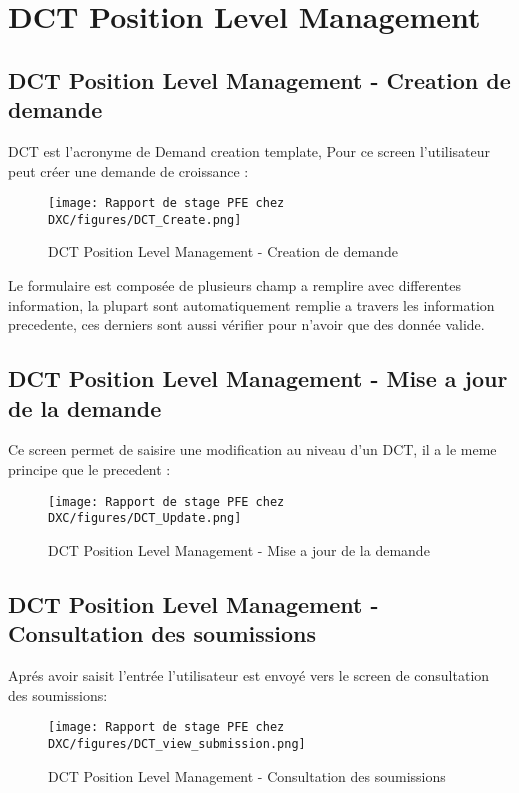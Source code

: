 \section{DCT Position Level Management}

\subsection{DCT Position Level Management - Creation de demande}

DCT est l'acronyme de Demand creation template, Pour ce screen l'utilisateur peut créer une demande de croissance : 

\begin{figure}[H]
    \centering
    \texttt{[image: Rapport de stage PFE chez DXC/figures/DCT\_Create.png]}
    \caption{DCT Position Level Management - Creation de demande }
\end{figure}

Le formulaire est composée de plusieurs champ a remplire avec differentes information, la plupart sont automatiquement remplie a travers les information precedente, ces derniers sont aussi vérifier pour n'avoir que des donnée valide.

\subsection{DCT Position Level Management - Mise a jour de la demande}

Ce screen permet de saisire une modification au niveau d'un DCT, il a le meme principe que le precedent : 

\begin{figure}[H]
    \centering
    \texttt{[image: Rapport de stage PFE chez DXC/figures/DCT\_Update.png]}
    \caption{DCT Position Level Management - Mise a jour de la demande}
\end{figure}

\subsection{DCT Position Level Management - Consultation des soumissions}

Aprés avoir saisit l'entrée l'utilisateur est envoyé vers le screen de consultation des soumissions:


\begin{figure}[H]
    \centering
    \texttt{[image: Rapport de stage PFE chez DXC/figures/DCT\_view\_submission.png]}
    \caption{DCT Position Level Management - Consultation des soumissions}
\end{figure}

